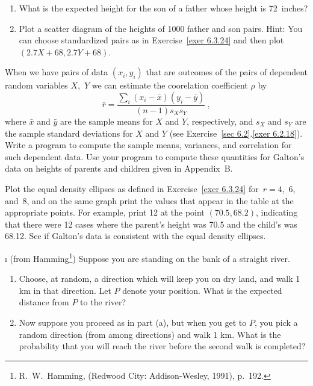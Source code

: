 {\begin{LJSItem}
\begin{enumerate}
\item What is the expected height for the son of a father whose height is 72~inches?

\item Plot a scatter diagram of the heights of 1000 father and son pairs.  \emx
{Hint}: You can choose standardized pairs as in Exercise~\ref{exer 6.3.24} and then
plot $(2.7X + 68, 2.7Y + 68)$.
\end{enumerate}



\istar\label{exer 6.3.26} When we have pairs of data $(x_i,y_i)$ that are outcomes of
the pairs of dependent random variables $X$,~$Y$ we can estimate the coorelation
coefficient
$\rho$ by
$$
\bar r = \frac {\sum_i (x_i - \bar x)(y_i - \bar y)}{(n - 1)s_Xs_Y}\ ,
$$ where $\bar x$ and $\bar y$ are the sample means for $X$ and $Y$,
respectively, and $s_X$ and $s_Y$ are the sample standard deviations for $X$ and $Y$
(see Exercise~\ref{sec 6.2}.\ref{exer 6.2.18}).  Write a
program to compute the sample means, variances, and correlation for such dependent
data.  Use your program to compute these quantities for Galton's data on heights of
parents and children given in Appendix~B.
\par
Plot the equal density ellipses as defined in Exercise~\ref{exer 6.3.24} for~$r =
4$,~6, and~8, and on the same graph print the values that appear in the table at the
appropriate points.  For example, print 12 at the point
$(70.5,68.2)$, indicating that there were 12 cases where the parent's height was 70.5
and the child's was 68.12.  See if Galton's data is consistent with the equal density
ellipses.

\i\label{exer 6.3.27} (from Hamming\footnote{R.~W.~Hamming,   (Redwood City:  Addison-Wesley, 1991), p.~192.})  
Suppose you are standing on the bank of a straight river.  
\begin{enumerate}
\item Choose, at random, a direction which will keep you on dry land, and walk 1 km
in that direction.  Let $P$ denote your position.  What is the expected distance from
$P$ to the river?
\item Now suppose you proceed as in part (a), but when you get to $P$, you pick a random
direction (from among   directions) and walk 1 km.  What is the probability 
that you will reach the river before the second walk is completed?
\end{enumerate}


\end{LJSItem}}
